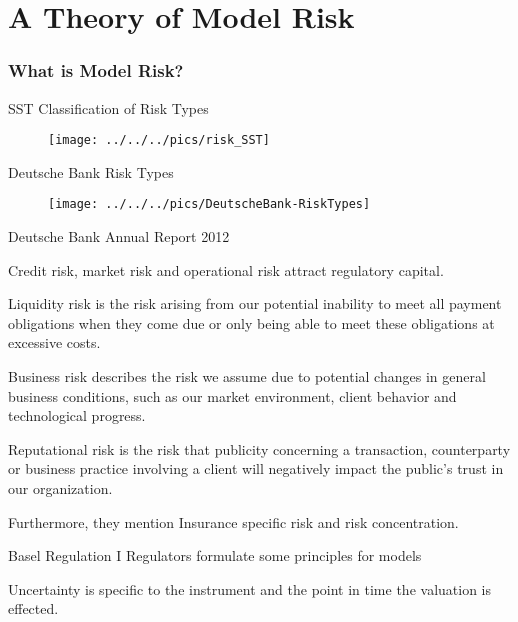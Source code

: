 
\part{A Theory of Model Risk}

\section{What is Model Risk?}

{SST Classification of Risk Types}
\begin{figure}
	\centering
		\texttt{[image: ../../../pics/risk\_SST]}
	\label{fig:Risk_map1}
\end{figure}

{Deutsche Bank Risk Types}
\begin{figure}
	\centering
		\texttt{[image: ../../../pics/DeutscheBank-RiskTypes]}
	\label{fig:Risk_map2}
\end{figure}

{Deutsche Bank Annual Report 2012}






	
Credit risk, market risk and operational risk attract regulatory capital.


	Liquidity risk is the risk arising from our potential inability to meet all payment obligations when they come due or only being able to meet these obligations at excessive costs.


	Business risk describes the risk we assume due to potential changes in general business conditions, such as our market environment, client behavior and technological progress.


	Reputational risk is the risk that publicity concerning a transaction, counterparty or business practice involving a client will negatively impact the public's trust in our organization.


	Furthermore, they mention Insurance specific risk and risk concentration.





{Basel Regulation I}
Regulators formulate some principles for models






	Uncertainty is specific to the instrument and the point in time the valuation is effected.


